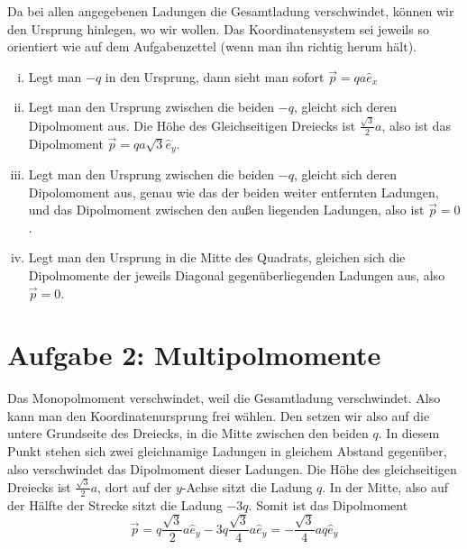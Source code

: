\documentclass[a4paper,german,12pt,smallheadings]{scrartcl}
\begin{document}
\begin{enumerate}[a)]
    Da bei allen angegebenen Ladungen die Gesamtladung verschwindet, können wir
    den Ursprung hinlegen, wo wir wollen. Das Koordinatensystem sei jeweils so
    orientiert wie auf dem Aufgabenzettel (wenn man ihn richtig herum hält).
    \begin{enumerate}[(i)]
      \item
        Legt man $-q$ in den Ursprung, dann sieht man sofort $\vec{p} = q a \hat{e}_x$
      \item
        Legt man den Ursprung zwischen die beiden $-q$, gleicht sich deren
        Dipolmoment aus. Die Höhe des Gleichseitigen Dreiecks ist
        $\frac{\sqrt{3}}{2} a$, also ist das Dipolmoment $\vec{p} = q a \sqrt{3} \hat{e}_y$.
      \item
        Legt man den Ursprung zwischen die beiden $-q$, gleicht sich deren
        Dipolomoment aus, genau wie das der beiden weiter entfernten Ladungen,
        und das Dipolmoment zwischen den außen liegenden Ladungen, also ist
        $\vec{p} = 0$.
      \item
        Legt man den Ursprung in die Mitte des Quadrats, gleichen sich die
        Dipolmomente der jeweils Diagonal gegenüberliegenden Ladungen aus, also
        $\vec{p} = 0$.
    \end{enumerate}
\end{enumerate}
\section*{Aufgabe 2: Multipolmomente}
Das Monopolmoment verschwindet, weil die Gesamtladung verschwindet. Also kann
man den Koordinatenursprung frei wählen. Den setzen wir also auf die untere
Grundseite des Dreiecks, in die Mitte zwischen den beiden $q$. In diesem Punkt
stehen sich zwei gleichnamige Ladungen in gleichem Abstand gegenüber, also
verschwindet das Dipolmoment dieser Ladungen. Die Höhe des gleichseitigen
Dreiecks ist $\frac{\sqrt{3}}{2}a$, dort auf der $y$-Achse sitzt die Ladung $q$.
In der Mitte, also auf der Hälfte der Strecke sitzt die Ladung $-3q$. Somit ist
das Dipolmoment
\begin{equation}
  \vec{p} = q \frac{\sqrt{3}}{2} a \hat{e}_y - 3q \frac{\sqrt{3}}{4} a \hat{e}_y = -\frac{\sqrt{3}}{4} aq\hat{e}_y
\end{equation}
\end{document}

